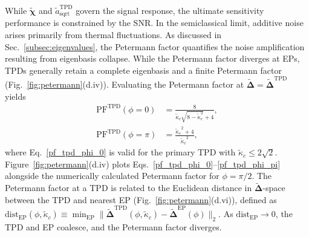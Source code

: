 \documentclass[%
  reprint,
  amsmath,amssymb,
  aps,
  prapplied,
  superscriptaddress,
  longbibliography]{revtex4-2}
\begin{document}
While $\boldsymbol{\tilde{\chi}}$ and $\tilde{a}_{\text{sqrt}}^\text{TPD}$ govern the signal response, the ultimate sensitivity performance is constrained by the SNR. In the semiclassical limit, additive noise arises primarily from thermal fluctuations. As discussed in Sec.~\ref{subsec:eigenvalues}, the Petermann factor quantifies the noise amplification resulting from eigenbasis collapse. While the Petermann factor diverges at EPs, TPDs generally retain a complete eigenbasis and a finite Petermann factor (Fig.~\ref{fig:petermann}(d.iv)). Evaluating the Petermann factor at $\boldsymbol{\tilde{\Delta}} = \boldsymbol{\tilde{\Delta}}^\text{TPD}$ yields
\begin{align}
    \text{PF}^\text{TPD}(\phi = 0) &= \frac{8}{\tilde{\kappa}_c \sqrt{8 - \tilde{\kappa}_c^2}+4},\label{pf_tpd_phi_0} \\
    \text{PF}^\text{TPD}(\phi = \pi) &= \frac{{\tilde{\kappa}_c}^2 +4}{{\tilde{\kappa}_c}^2},\label{pf_tpd_phi_pi}
\end{align}
where Eq.~\ref{pf_tpd_phi_0} is valid for the primary TPD with $\tilde{\kappa}_c \leq 2\sqrt{2}$. Figure~\ref{fig:petermann}(d.iv) plots Eqs.~\ref{pf_tpd_phi_0}--\ref{pf_tpd_phi_pi} alongside the numerically calculated Petermann factor for $\phi = \pi/2$. The Petermann factor at a TPD is related to the Euclidean distance in $\boldsymbol{\tilde{\Delta}}$-space between the TPD and nearest EP (Fig.~\ref{fig:petermann}(d.vi)), defined as $\text{dist}_\text{EP}(\phi, \tilde{\kappa}_c) \equiv \min_\text{EP} \lVert \boldsymbol{\tilde{\Delta}}^\text{TPD}(\phi, \tilde{\kappa}_c) - \boldsymbol{\tilde{\Delta}}^\text{EP}(\phi) \rVert_2$. As $\text{dist}_\text{EP} \to 0$, the TPD and EP coalesce, and the Petermann factor diverges.
\end{document}
